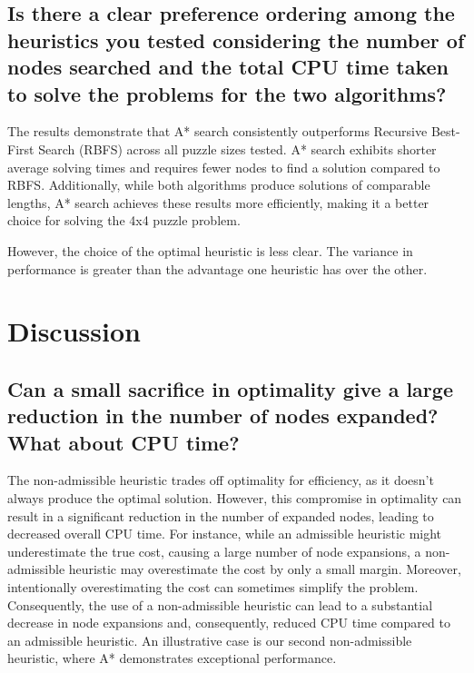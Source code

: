 \documentclass{article}
\begin{document}
 

\subsection{  Is there a clear preference ordering among the heuristics you tested considering the number of nodes searched and the total CPU time taken to solve the problems for the two algorithms?}
 
The results demonstrate that A* search consistently outperforms Recursive Best-First Search (RBFS) across all puzzle sizes tested. A* search exhibits shorter average solving times and requires fewer nodes to find a solution compared to RBFS. Additionally, while both algorithms produce solutions of comparable lengths, A* search achieves these results more efficiently, making it a better choice for solving the 4x4 puzzle problem.

However, the choice of the optimal heuristic is less clear. The variance in performance is greater than the advantage one heuristic has over the other. 

\section{Discussion}

\subsection{  Can a small sacrifice in optimality give a large reduction in the number of nodes expanded? What about CPU time?}

{The non-admissible heuristic trades off optimality for efficiency, as it doesn't always produce the optimal solution. However, this compromise in optimality can result in a significant reduction in the number of expanded nodes, leading to decreased overall CPU time. For instance, while an admissible heuristic might underestimate the true cost, causing a large number of node expansions, a non-admissible heuristic may overestimate the cost by only a small margin. Moreover, intentionally overestimating the cost can sometimes simplify the problem. Consequently, the use of a non-admissible heuristic can lead to a substantial decrease in node expansions and, consequently, reduced CPU time compared to an admissible heuristic. An illustrative case is our second non-admissible heuristic, where A* demonstrates exceptional performance.}
\end{document}
